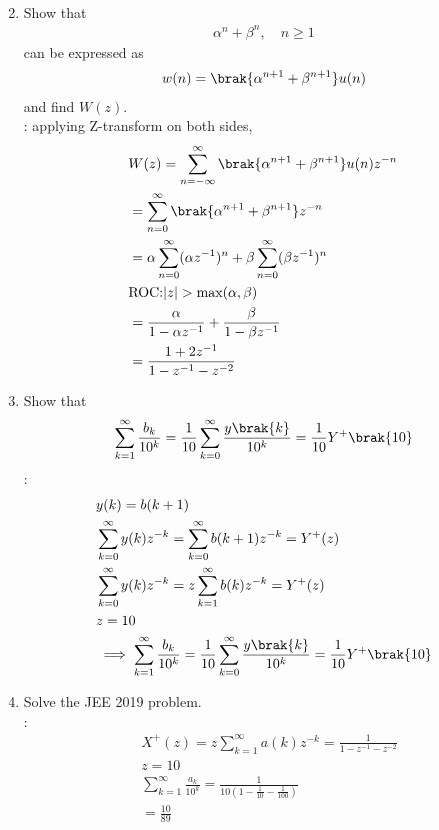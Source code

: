 \documentclass[journal,12pt,twocolumn]{IEEEtran}
\renewcommand\thesection{\arabic{section}}
\begin{document}
\begin{enumerate}[label=\thesection.\arabic*,ref=\thesection.\theenumi]
\begin{align}
\end{align}
 \item Show that 
\begin{align}
	\alpha^n + \beta^n, \quad n \ge 1
\end{align}
can be expressed as 
\begin{align}
	w(n) =\brak{\alpha^{n+1} + \beta^{n+1}}u(n)
\end{align}
		and find $W(z)$.\\
\solution:
	applying Z-transform on both sides,
	\begin{align}
	&W(z)=\sum_{n=-\infty}^{\infty}\brak{\alpha^{n+1} + \beta^{n+1}}u(n)z^{-n}\\
	&=\sum_{n=0}^{\infty}\brak{\alpha^{n+1} + \beta^{n+1}}z^{-n}\\
	&=\alpha \sum_{n=0}^{\infty}(\alpha z^{-1})^{n}+\beta \sum_{n=0}^{\infty} (\beta z^{-1})^{n}\\
	&\text{ROC:} |z|>\text{max}(\alpha,\beta)\\
	&=\frac{\alpha}{1-\alpha z^{-1}}+\frac{\beta}{1-\beta z^{-1}}\\
	&=\frac{1+2z^{-1}}{1-z^{-1}-z^{-2}}
	\end{align}
 \item Show that 
\begin{align}
	\sum_{k=1}^{\infty}\frac{b_k}{10^k} =
	\frac{1}{10}\sum_{k=0}^{\infty}\frac{y\brak{k}}{10^k} =\frac{1}{10}Y^{+}\brak{{10}}
\end{align}
\solution:
\begin{align}
&y(k)=b(k+1)\\
&\sum_{k=0}^{\infty} y(k) z^{-k}=\sum_{k=0}^{\infty} b(k+1) z^{-k}=Y^{+}(z)\\
&\sum_{k=0}^{\infty} y(k) z^{-k}=z\sum_{k=1}^{\infty} b(k) z^{-k}=Y^{+}(z)\\
&z=10\\
&\implies \sum_{k=1}^{\infty}\frac{b_k}{10^k} =
	\frac{1}{10}\sum_{k=0}^{\infty}\frac{y\brak{k}}{10^k} =\frac{1}{10}Y^{+}\brak{{10}}
\end{align}
\item Solve the JEE 2019 problem.\\
\solution:
 \begin{align}
&X^{+}(z)=z\sum_{k=1}^{\infty} a(k) z^{-k}=\frac{1}{1-z^{-1}-z^{-2}}\\
&z=10\\
&\sum_{k=1}^{\infty} \frac{a_k}{10^k}=\frac{1}{10 \left(1-\frac{1}{10}-\frac{1}{100}\right)}\\
&=\frac{10}{89}
\end{align}

\end{enumerate}
\end{document}

